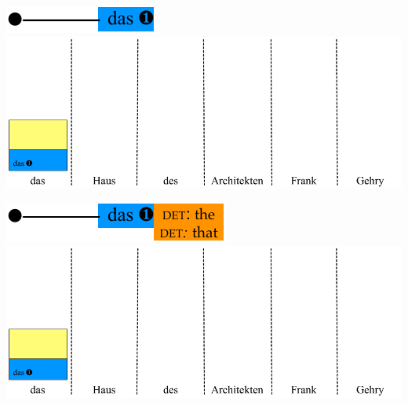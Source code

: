 \documentclass[landscape]{slides}
\begin{document}

\begin{center}\vspace{15mm}
\includegraphics[scale=1.4]{accessing-grammar-rules-prefix-early0.pdf}\\[31mm]
\includegraphics[scale=1.4]{accessing-grammar-rules-early-example1.pdf}
\end{center}


\begin{center}\vspace{15mm}
\includegraphics[scale=1.4]{accessing-grammar-rules-prefix-early1.pdf}\\[27mm]
\includegraphics[scale=1.4]{accessing-grammar-rules-early-example1.pdf}
\end{center}

\end{document}

